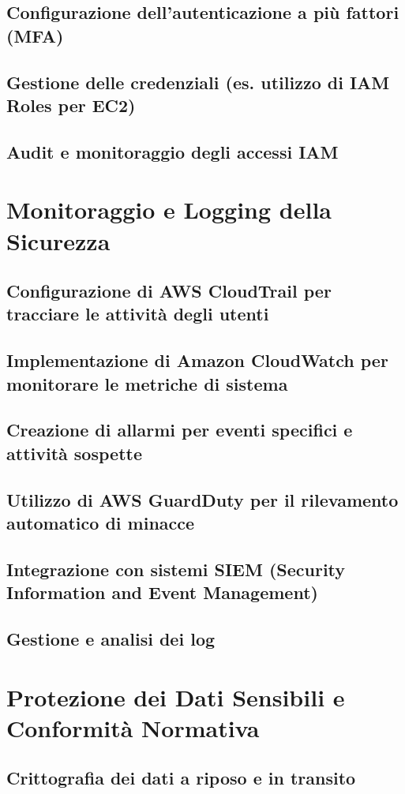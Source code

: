\documentclass[a4paper,12pt]{report}
\begin{document}
\section{Configurazione dell'autenticazione a più fattori (MFA)}
\section{Gestione delle credenziali (es. utilizzo di IAM Roles per EC2)}
\section{Audit e monitoraggio degli accessi IAM}

\chapter{Monitoraggio e Logging della Sicurezza}
\section{Configurazione di AWS CloudTrail per tracciare le attività degli utenti}
\section{Implementazione di Amazon CloudWatch per monitorare le metriche di sistema}
\section{Creazione di allarmi per eventi specifici e attività sospette}
\section{Utilizzo di AWS GuardDuty per il rilevamento automatico di minacce}
\section{Integrazione con sistemi SIEM (Security Information and Event Management)}
\section{Gestione e analisi dei log}

\chapter{Protezione dei Dati Sensibili e Conformità Normativa}
\section{Crittografia dei dati a riposo e in transito}
\end{document}
